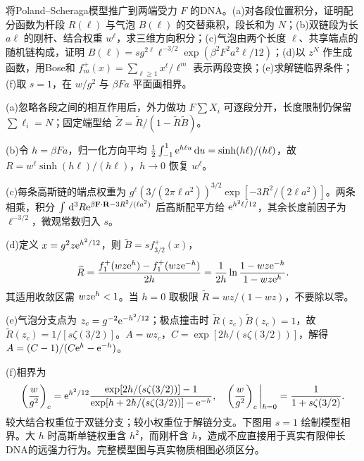 \begin{exercise}
将Poland--Scheraga模型推广到两端受力 $F$ 的DNA。(a)对各段位置积分，证明配分函数为杆段 $R(\ell)$ 与气泡 $B(\ell)$ 的交替乘积，段长和为 $N$；(b)双链段为长 $a\ell$ 的刚杆、结合权重 $w^\ell$，求三维方向积分；(c)气泡由两个长度 $\ell$、共享端点的随机链构成，证明 $B(\ell)=s g^{2\ell}\ell^{-3/2}\exp(\beta^2F^2a^2\ell/12)$；(d)以 $z^N$ 作生成函数，用Bose和 $f_m^+(x)=\sum_{\ell\ge1}x^\ell/\ell^m$ 表示两段变换；(e)求解链临界条件；(f)取 $s=1$，在 $w/g^2$ 与 $\beta Fa$ 平面画相界。
\end{exercise}
\begin{solution}
(a)忽略各段之间的相互作用后，外力做功 $F\sum X_i$ 可逐段分开，长度限制仍保留 $\sum\ell_i=N$；固定端型给 $\widetilde Z=\widetilde R/(1-\widetilde R\widetilde B)$。

(b)令 $h=\beta Fa$，归一化方向平均 $\tfrac12\int_{-1}^1\mathrm e^{h\ell u}\,\mathrm d u=\sinh(h\ell)/(h\ell)$，故 $R=w^\ell\sinh(h\ell)/(h\ell)$，$h\to0$ 恢复 $w^\ell$。

(c)每条高斯链的端点权重为 $g^\ell(3/(2\pi\ell a^2))^{3/2}\exp[-3R^2/(2\ell a^2)]$。两条相乘，积分 $\int\,\mathrm d^3R\mathrm e^{\beta\mathbf F\cdot\mathbf R-3R^2/(\ell a^2)}$ 后高斯配平方给 $\mathrm e^{h^2\ell/12}$，其余长度前因子为 $\ell^{-3/2}$，微观常数归入 $s$。

(d)定义 $x=g^2z\mathrm e^{h^2/12}$，则 $\widetilde B=s f_{3/2}^+(x)$，
\[
\widetilde R=\frac{f_1^+(wz\mathrm e^h)-f_1^+(wz\mathrm e^{-h})}{2h}
=\frac1{2h}\ln\frac{1-wz\mathrm e^{-h}}{1-wz\mathrm e^h}.
\]
其适用收敛区需 $wz\mathrm e^h<1$。当 $h=0$ 取极限 $\widetilde R=wz/(1-wz)$，不要除以零。

(e)气泡分支点为 $z_c=g^{-2}\mathrm e^{-h^2/12}$；极点撞击时 $\widetilde R(z_c)\widetilde B(z_c)=1$，故 $\widetilde R(z_c)=1/[s\zeta(3/2)]$。$A=wz_c$，$C=\exp[2h/(s\zeta(3/2))]$，解得 $A=(C-1)/(C\mathrm e^h-\mathrm e^{-h})$。

(f)相界为
\[
\left(\frac w{g^2}\right)_c
=\mathrm e^{h^2/12}\frac{\exp[2h/(s\zeta(3/2))]-1}
{\exp[h+2h/(s\zeta(3/2))]-\mathrm e^{-h}},\quad
\left(\frac w{g^2}\right)_c\bigg|_{h=0}=\frac1{1+s\zeta(3/2)}.
\]
较大结合权重位于双链分支；较小权重位于解链分支。下图用 $s=1$ 绘制模型相界。大 $h$ 时高斯单链权重含 $h^2$，而刚杆含 $h$，造成不应直接用于真实有限伸长DNA的远强力行为。完整模型图与真实物质相图必须区分。
\begin{center}\end{center}
\end{solution}

